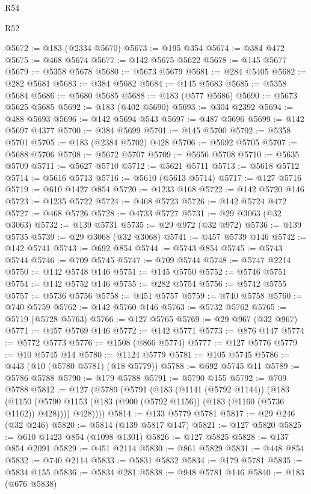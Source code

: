 \begin{lexlean}{R54}
\begin{lexlean}{R52}
\begin{coremodule}
{{{{{{{{{{{{{{{{{{{{{{{{{{{{{{{{{{{{{{{{{{{{{{{{{{{{{{{{{{{{{{{{{{{{{{{{{{{{{{{{{{{{{{{{{{{{{{{{{{{{{{{{{{{{{{{{{{{{{{{{{{{{{{{{{{{{{{{{{{{{{{{{{{{{{{{{{{{{{{{{{{{{{{{{{{{{{{{{{{{{{{{{{{{{{{{{{{{{{{@5672 := @183 (@2334 @5670)
@5673 := @195 @354
@5674 := @384 @472
@5675 := @468 @5674
@5677 := @142 @5675 @5622
@5678 := @145 @5677
@5679 := @5358 @5678
@5680 := @5673 @5679
@5681 := @284 @5405
@5682 := @282 @5681
@5683 := @384 @5682
@5684 := @145 @5683
@5685 := @5358 @5684
@5686 := @5680 @5685
@5688 := @183 (@577 @5686)
@5690 := @5673 @5625 @5685
@5692 := @183 (@402 @5690)
@5693 := @304 @2392
@5694 := @488 @5693
@5696 := @142 @5694 @543
@5697 := @487 @5696
@5699 := @142 @5697 @4377
@5700 := @384 @5699
@5701 := @145 @5700
@5702 := @5358 @5701
@5705 := @183 (@2384 @5702) @428
@5706 := @5692 @5705
@5707 := @5688 @5706
@5708 := @5672 @5707
@5709 := @5656 @5708
@5710 := @5635 @5709
@5711 := @5627 @5710
@5712 := @5621 @5711
@5713 := @5618 @5712
@5714 := @5616 @5713
@5716 := @5610 (@5613 @5714)
@5717 := @127 @5716
@5719 := @610 @1427 @854
@5720 := @1233 @168
@5722 := @142 @5720 @146
@5723 := @1235 @5722
@5724 := @468 @5723
@5726 := @142 @5724 @472
@5727 := @468 @5726
@5728 := @4733 @5727
@5731 := @29 @3063 (@32 @3063)
@5732 := @139 @5731
@5735 := @29 @972 (@32 @972)
@5736 := @139 @5735
@5739 := @29 @3068 (@32 @3068)
@5741 := @457 @5739 @146
@5742 := @142 @5741
@5743 := @692 @854
@5744 := @5743 @854
@5745 := @5743 @5744
@5746 := @709 @5745
@5747 := @709 @5744
@5748 := @5747 @2214
@5750 := @142 @5748 @146
@5751 := @145 @5750
@5752 := @5746 @5751
@5754 := @142 @5752 @146
@5755 := @282 @5754
@5756 := @5742 @5755
@5757 := @5736 @5756
@5758 := @451 @5757
@5759 := @740 @5758
@5760 := @740 @5759
@5762 := @142 @5760 @146
@5763 := @5732 @5762
@5765 := @5719 (@5728 @5763)
@5766 := @127 @5765
@5769 := @29 @967 (@32 @967)
@5771 := @457 @5769 @146
@5772 := @142 @5771
@5773 := @876 @147
@5774 := @5772 @5773
@5776 := @1508 (@866 @5774)
@5777 := @127 @5776
@5779 := @10 @5745 @14
@5780 := @1124 @5779
@5781 := @105 @5745
@5786 := @443 (@10 (@5780 @5781) (@18 @5779))
@5788 := @692 @5745 @11
@5789 := @5786 @5788
@5790 := @179 @5788
@5791 := @5790 @155
@5792 := @709 @5788
@5812 := @127
    (@5789
      (@5791
        (@183
          (@1141 (@5792 @1144))
          (@183
            (@1150 (@5790 @1153 (@183 (@900 (@5792 @1156)) (@183 (@1160 (@5736 @1162)) @428))))
            @428))))
@5814 := @133 @5779 @5781
@5817 := @29 @246 (@32 @246)
@5820 := @5814 (@139 @5817 @147)
@5821 := @127 @5820
@5825 := @610 @1423 @854 (@1098 @1301)
@5826 := @127 @5825
@5828 := @137 @854 @2091
@5829 := @451 @2114
@5830 := @861 @5829
@5831 := @448 @854
@5832 := @740 @2114
@5833 := @5831 @5832
@5834 := @179 @5781
@5835 := @5834 @155
@5836 := @5834 @281
@5838 := @948 @5781 @146
@5840 := @183 (@676 @5838)
}}}}}}}}}}}}}}}}}}}}}}}}}}}}}}}}}}}}}}}}}}}}}}}}}}}}}}}}}}}}}}}}}}}}}}}}}}}}}}}}}}}}}}}}}}}}}}}}}}}}}}}}}}}}}}}}}}}}}}}}}}}}}}}}}}}}}}}}}}}}}}}}}}}}}}}}}}}}}}}}}}}}}}}}}}}}}}}}}}}}}}}}}}}}}}}}}}}}}}
\end{coremodule}
\end{lexlean}
\end{lexlean}
